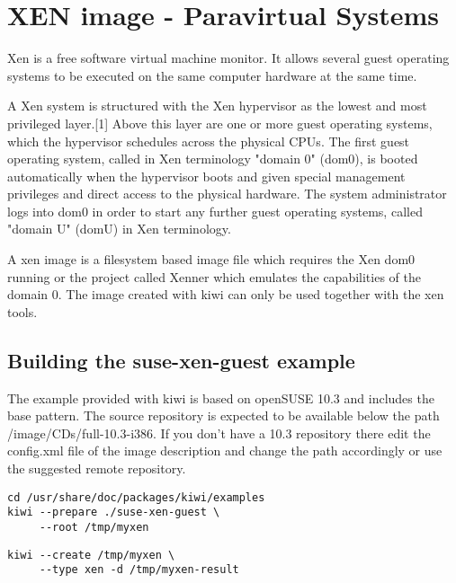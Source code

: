 \chapter{XEN image - Paravirtual Systems}
\label{chapter:xen}
\minitoc

Xen is a free software virtual machine monitor. It allows several
guest operating systems to be executed on the same computer hardware
at the same time.

A Xen system is structured with the Xen hypervisor as the lowest and
most privileged layer.[1] Above this layer are one or more guest
operating systems, which the hypervisor schedules across the physical
CPUs. The first guest operating system, called in Xen terminology
"domain 0" (dom0), is booted automatically when the hypervisor boots
and given special management privileges and direct access to the physical
hardware. The system administrator logs into dom0 in order to start
any further guest operating systems, called "domain U" (domU) in
Xen terminology.

A xen image is a filesystem based image file which requires the
Xen dom0 running or the project called Xenner which emulates
the capabilities of the domain 0. The image created with kiwi
can only be used together with the xen tools.

\section{Building the suse-xen-guest example}

The example provided with kiwi is based on openSUSE 10.3 and includes
the base pattern. The source repository is expected to be
available below the path /image/CDs/full-10.3-i386. If you don't have
a 10.3 repository there edit the config.xml file of the image description
and change the path accordingly or use the suggested remote repository.

\begin{Command}{12cm}
\begin{verbatim}
cd /usr/share/doc/packages/kiwi/examples
kiwi --prepare ./suse-xen-guest \
     --root /tmp/myxen
\end{verbatim}
\end{Command}

\begin{Command}{12cm}
\begin{verbatim}
kiwi --create /tmp/myxen \
     --type xen -d /tmp/myxen-result
\end{verbatim}
\end{Command}

